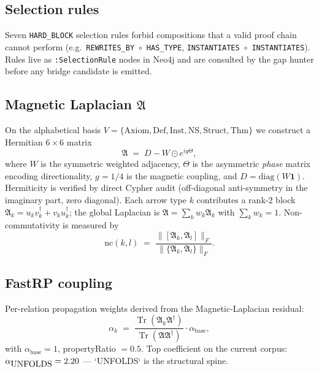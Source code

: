 \documentclass[11pt]{article}
\newcommand{\magA}{\mathfrak{A}}
\newcommand{\Tr}{\operatorname{Tr}}
\begin{document}
\subsection{Selection rules}
Seven \texttt{HARD\_BLOCK} selection rules forbid compositions that a
valid proof chain cannot perform (e.g.\ \lstinline|REWRITES_BY|~$\circ$~\lstinline|HAS_TYPE|,
\lstinline|INSTANTIATES|~$\circ$~\lstinline|INSTANTIATES|).
Rules live as \lstinline|:SelectionRule| nodes in Neo4j and are
consulted by the gap hunter before any bridge candidate is emitted.

\subsection{Magnetic Laplacian \texorpdfstring{$\magA$}{A}}

On the alphabetical basis
$V=\{\text{Axiom},\text{Def},\text{Inst},\text{NS},\text{Struct},\text{Thm}\}$
we construct a Hermitian $6\times 6$ matrix
\begin{equation}
  \magA \;=\; D - W \odot e^{i g \Theta},
\end{equation}
where $W$ is the symmetric weighted adjacency, $\Theta$ is the asymmetric
\emph{phase} matrix encoding directionality, $g = 1/4$ is the magnetic
coupling, and $D=\mathrm{diag}(W\mathbf{1})$. Hermiticity is verified by
direct Cypher audit (off-diagonal anti-symmetry in the imaginary part,
zero diagonal). Each arrow type $k$ contributes a rank-$2$ block
$\magA_k = u_k v_k^\dagger + v_k u_k^\dagger$; the global Laplacian is
$\magA = \sum_k w_k \magA_k$ with $\sum_k w_k = 1$. Non-commutativity is
measured by
\begin{equation}
  \mathrm{nc}(k,l) \;=\; \frac{\|[\magA_k,\magA_l]\|_F}{\|\{\magA_k,\magA_l\}\|_F}.
\end{equation}

\subsection{FastRP coupling}

Per-relation propagation weights derived from the Magnetic-Laplacian
residual:
\begin{equation}
  \alpha_k \;=\; \frac{\Tr(\magA_k \magA^\dagger)}{\Tr(\magA \magA^\dagger)}\cdot\alpha_{\text{base}},
\end{equation}
with $\alpha_{\text{base}}=1$, propertyRatio $= 0.5$. Top coefficient
on the current corpus: $\alpha_{\lstinline|UNFOLDS|} = 2.20$ --- `UNFOLDS`
is the structural spine.
\end{document}
